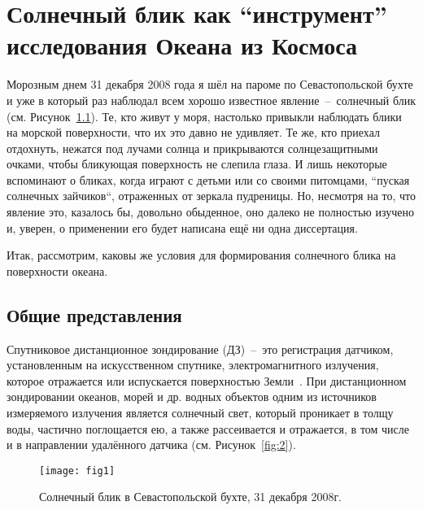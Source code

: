 \chapter{Солнечный блик как ``инструмент'' исследования Океана из Космоса} \label{chap:1}

Морозным днем 31 декабря 2008 года я шёл на пароме по Севастопольской бухте и уже в который раз наблюдал всем хорошо известное явление~--~солнечный блик (см. Рисунок~\ref{fig:1}). Те, кто живут у моря, настолько привыкли наблюдать блики на морской поверхности, что их это давно не удивляет. Те же, кто приехал отдохнуть, нежатся под лучами солнца и прикрываются солнцезащитными очками, чтобы бликующая поверхность не слепила глаза. И лишь некоторые вспоминают о бликах, когда играют с детьми или со своими питомцами, ``пуская солнечных зайчиков``, отраженных от зеркала пудреницы. Но, несмотря на то, что явление это, казалось бы, довольно обыденное, оно далеко не полностью изучено и, уверен, о применении его будет написана ещё ни одна диссертация. 

Итак, рассмотрим, каковы же условия для формирования солнечного блика на поверхности океана.





\section{Общие представления} \label{sec:1.1}


Спутниковое дистанционное зондирование (ДЗ)~--~это регистрация датчиком, установленным на искусственном спутнике, электромагнитного излучения, которое отражается или испускается поверхностью Земли~\citep{Robinson2004}. При дистанционном зондировании океанов, морей и др. водных объектов одним из источников измеряемого излучения является солнечный свет, который проникает в толщу воды, частично поглощается ею, а также рассеивается и отражается, в том числе и в направлении удалённого датчика (см. Рисунок~\ref{fig:2}).



\begin{figure}[!thb]
 \center
 \texttt{[image: fig1]}
 \caption{Солнечный блик в Севастопольской бухте, 31 декабря 2008г.}
 \label{fig:1}
\end{figure}

